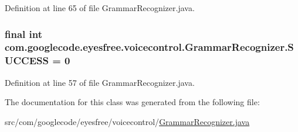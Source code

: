 Definition at line 65 of file Grammar\-Recognizer.\-java.

\hypertarget{classcom_1_1googlecode_1_1eyesfree_1_1voicecontrol_1_1_grammar_recognizer_a2725b39cfa9b27f08885011fac773584}{
\subsubsection[{S\-U\-C\-C\-E\-S\-S}]{\setlength{\rightskip}{0pt plus 5cm}final int {\bf com.\-googlecode.\-eyesfree.\-voicecontrol.\-Grammar\-Recognizer.\-S\-U\-C\-C\-E\-S\-S} = 0}}\label{classcom_1_1googlecode_1_1eyesfree_1_1voicecontrol_1_1_grammar_recognizer_a2725b39cfa9b27f08885011fac773584}


Definition at line 57 of file Grammar\-Recognizer.\-java.



The documentation for this class was generated from the following file\-:\begin{DoxyCompactItemize}
\item 
src/com/googlecode/eyesfree/voicecontrol/\hyperlink{_grammar_recognizer_8java}{Grammar\-Recognizer.\-java}\end{DoxyCompactItemize}
